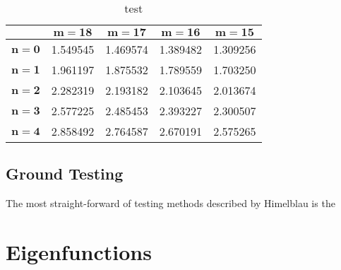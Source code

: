 \documentclass[]{aiaa-tc}%
\begin{document}
\begin{center}
\begin{table}[htb]
\begin{tabular}{| c | c c c c |}
\hline
{} &  $\mathbf{m=18}$ &  $\mathbf{m=17}$ &  $\mathbf{m=16}$ &  $\mathbf{m=15}$ \\
\hline
$\mathbf{n=0}$ &       1.549545 &       1.469574 &       1.389482 &       1.309256 \\
$\mathbf{n=1}$ &       1.961197 &       1.875532 &       1.789559 &       1.703250 \\
$\mathbf{n=2}$ &       2.282319 &       2.193182 &       2.103645 &       2.013674 \\
$\mathbf{n=3}$ &       2.577225 &       2.485453 &       2.393227 &       2.300507 \\
$\mathbf{n=4}$ &       2.858492 &       2.764587 &       2.670191 &       2.575265 \\
\hline
\end{tabular}
\caption{test}
\end{table}
\end{center}





\subsection{Ground Testing}

The most straight-forward of testing methods described by Himelblau is the










\section{Eigenfunctions}
\end{document}

